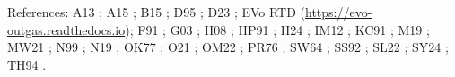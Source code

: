 \begin{landscape}
\begin{center}
\begin{minipage}{\spanwidth}
\smallskip
References: A13 \parencite{ardia2013}; A15
\parencite{armstrong2015speciation}; B15 \parencite{Burgisser2015};
D95 \parencite{dixon1995}; D23 \parencite{Ding2023}; EVo RTD
(\url{https://evo-outgas.readthedocs.io}); F91 \parencite{Frost1991};
G03 \parencite{Gaillard2003}; H08 \parencite{hirschmann2008-LEPR};
HP91 \parencite{holland1991}; H24 \parencite{hughes2024}; IM12
\parencite{IaconoMarziano2012}; KC91 \parencite{Kress1991}; M19
\parencite{moussallam2019}; MW21 \parencite{Muth2021}; N99
\parencite{nzotta1999}; N19 \parencite{Nash2019}; OK77
\parencite{ohmoto1977}; O21 \parencite{o2021thermodynamic}; OM22
\parencite{Oneill2022}; PR76 \parencite{peng1976}; SW64
\parencite{shaw1964}; SS92 \parencite{shi1992}; SL22
\parencite{Sun2022}; SY24 \parencite{Sun2024}; TH94
\parencite{thibault1994solubility}.
\end{minipage}
\end{center}
\end{landscape}